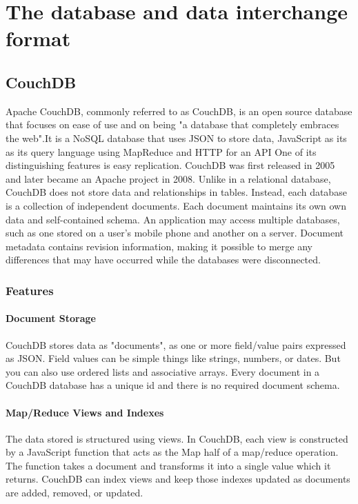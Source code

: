 \documentclass[a4paper,11pt,conference]{IEEEtran}
\begin{document}
	\section{The database and data interchange format}

		\subsection{CouchDB}

		Apache CouchDB, commonly referred to as CouchDB, is an open source database that focuses on ease of use and on being "a database that completely embraces the web".It is a NoSQL database that uses JSON to store data, JavaScript as its as its query language using  MapReduce and HTTP for an API One of its distinguishing features is easy replication. CouchDB was first released in 2005 and later became an Apache project in 2008.
		Unlike in a relational database, CouchDB does not store data and relationships in tables. Instead, each database is a collection of independent documents. Each document maintains its own own data and self-contained schema. An application may access multiple databases, such as one stored on a user's mobile phone and another on a server. Document metadata contains revision information, making it possible to merge any differences that may have occurred while the databases were disconnected.

		\subsubsection{Features}

			\paragraph{Document Storage}
			CouchDB stores data as "documents", as one or more field/value pairs expressed as JSON. Field values can be simple things like strings, numbers, or dates. But you can also use ordered lists and associative arrays. Every document in a CouchDB database has a unique id and there is no required document schema.

			\paragraph{Map/Reduce Views and Indexes}
			The data stored is structured using views. In CouchDB, each view is constructed by a JavaScript function that acts as the Map half of a map/reduce operation. The function takes a document and transforms it into a single value which it returns. CouchDB can index views and keep those indexes updated as documents are added, removed, or updated.
\end{document}
